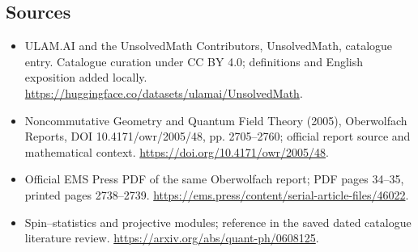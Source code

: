 \documentclass[11pt]{article}
\begin{document}
\subsection{Sources}
\begin{itemize}
\item[\hypertarget{source:statement:1}{S1}] ULAM.AI and the UnsolvedMath Contributors, UnsolvedMath, catalogue entry. Catalogue curation under CC BY 4.0; definitions and English exposition added locally.
\url{https://huggingface.co/datasets/ulamai/UnsolvedMath}.
\item[\hypertarget{source:statement:2}{S2}] Noncommutative Geometry and Quantum Field Theory (2005), Oberwolfach Reports, DOI 10.4171/owr/2005/48, pp. 2705--2760; official report source and mathematical context.
\url{https://doi.org/10.4171/owr/2005/48}.
\item[\hypertarget{source:statement:3}{S3}] Official EMS Press PDF of the same Oberwolfach report; PDF pages 34--35, printed pages 2738--2739.
\url{https://ems.press/content/serial-article-files/46022}.
\item[\hypertarget{source:statement:4}{S4}] Spin--statistics and projective modules; reference in the saved dated catalogue literature review.
\url{https://arxiv.org/abs/quant-ph/0608125}.
\end{itemize}
\label{end:statement}
\end{document}
